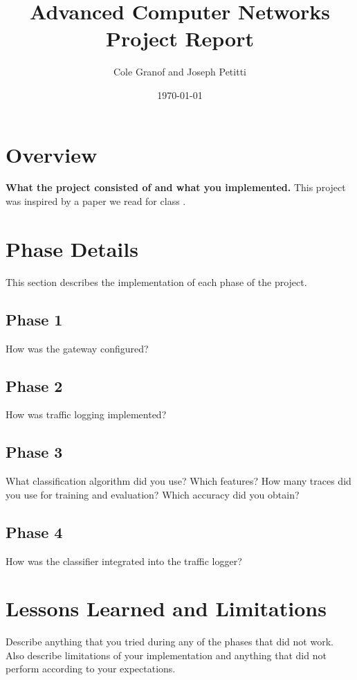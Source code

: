 \documentclass[a4paper, 11pt]{article} %
\title{Advanced Computer Networks Project Report}
\author{Cole Granof and Joseph Petitti}
\date{\today}
\begin{document}
\thispagestyle{empty}

\maketitle

\section{Overview}

\textbf{What the project consisted of and what you implemented.} This project
was inspired by a paper we read for class \cite{tscm16}.

\lipsum


\section{Phase Details}

This section describes the implementation of each phase of the project.

\subsection{Phase 1}

How was the gateway configured?

\lipsum

\subsection{Phase 2}

How was traffic logging implemented?

\lipsum

\subsection{Phase 3}

What classification algorithm did you use? Which features? How many traces did
you use for training and evaluation? Which accuracy did you obtain?

\lipsum

\subsection{Phase 4}

How was the classifier integrated into the traffic logger?

\lipsum

\section{Lessons Learned and Limitations}

Describe anything that you tried during any of the phases that did not work.
Also describe limitations of your implementation and anything that did not
perform according to your expectations.

\newpage

\printbibliography
\end{document}
